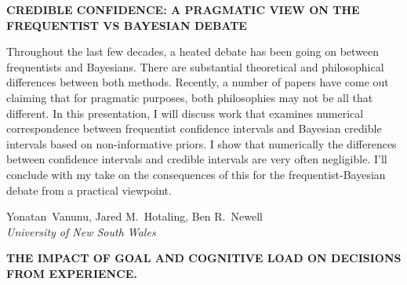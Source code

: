 \documentclass[]{article}
\begin{document}
\textbf{CREDIBLE CONFIDENCE: A PRAGMATIC VIEW ON THE FREQUENTIST VS
BAYESIAN DEBATE}

Throughout the last few decades, a heated debate has been going on
between frequentists and Bayesians. There are substantial theoretical
and philosophical differences between both methods. Recently, a number
of papers have come out claiming that for pragmatic purposes, both
philosophies may not be all that different. In this presentation, I will
discuss work that examines numerical correspondence between frequentist
confidence intervals and Bayesian credible intervals based on
non-informative priors. I show that numerically the differences between
confidence intervals and credible intervals are very often negligible.
I'll conclude with my take on the consequences of this for the
frequentist-Bayesian debate from a practical viewpoint.\\
\pagebreak  

Yonatan~Vanunu, Jared M.~Hotaling, Ben R.~Newell\\
\emph{University of New South Wales}

\textbf{THE IMPACT OF GOAL AND COGNITIVE LOAD ON DECISIONS FROM
EXPERIENCE.}
\end{document}
